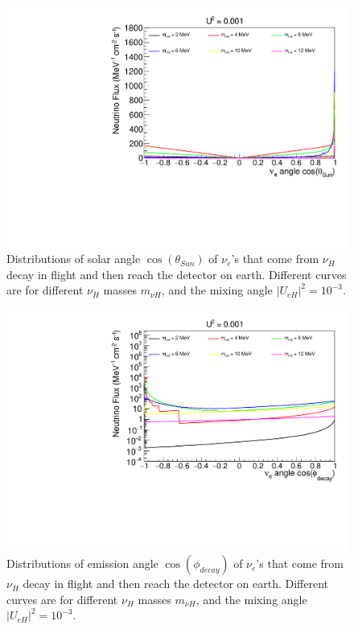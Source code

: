 \documentclass[%
 reprint,
 amsmath,amssymb,
 aps,
 prd,
floatfix,
twocolumn,
]{revtex4-1}
\begin{document}
\begin{figure}[!htbp]
\includegraphics[width=0.99\columnwidth]{../plots/DecayInFlightNuLCosthetaSun_U0.001_AllMass_linXlinY.pdf}
\caption{Distributions of solar angle $\cos(\theta_{Sun})$ of $\nu_e$'s that come from $\nu_H$ decay in flight and then reach the detector on earth. Different curves are for different $\nu_H$ masses $m_{\nu H}$, and the mixing angle $|U_{eH}|^2 = 10^{-3}$.}
\label{fig:DecayInFlightTheta_U1em3_AllMass}
\end{figure}

\begin{figure}[!htbp]
\includegraphics[width=0.99\columnwidth]{../plots/DecayInFlightNuLCosphiSun_U0.001_AllMass_linXlogY.pdf}
\caption{Distributions of emission angle $\cos(\phi_{decay})$ of $\nu_e$'s that come from $\nu_H$ decay in flight and then reach the detector on earth. Different curves are for different $\nu_H$ masses $m_{\nu H}$, and the mixing angle $|U_{eH}|^2 = 10^{-3}$.}
\label{fig:DecayInFlightPhi_U1em3_AllMass}
\end{figure}
\end{document}
